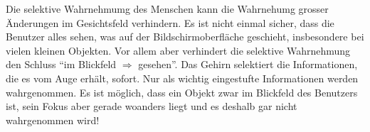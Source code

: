 
Die selektive Wahrnehmumg des Menschen kann die Wahrnehumg grosser Änderungen im Gesichtsfeld verhindern.
Es ist nicht einmal sicher, dass die Benutzer alles sehen, was auf der Bildschirmoberfläche geschieht, 
insbesondere bei vielen kleinen Objekten.
Vor allem aber verhindert die selektive Wahrnehmung den Schluss 
\enquote{im Blickfeld $\Rightarrow$ gesehen}. Das Gehirn selektiert die Informationen, 
die es vom Auge erhält, sofort. Nur als wichtig eingestufte Informationen werden wahrgenommen. 
Es ist möglich, dass ein Objekt zwar im Blickfeld des Benutzers ist, 
sein Fokus aber gerade woanders liegt und es deshalb gar nicht wahrgenommen wird!